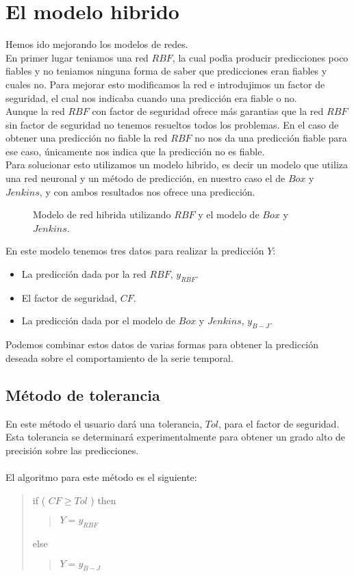 %
%

\section{El modelo hibrido}

Hemos ido mejorando los modelos de redes.\\

En primer lugar teniamos una red $RBF$, la cual pod\'{\i}a producir predicciones
poco fiables y no teniamos ninguna forma de saber que predicciones eran fiables
y cuales no. Para mejorar esto modificamos la red e introdujimos un factor de
seguridad, el cual nos indicaba cuando una predicci\'on era fiable o no.\\

Aunque la red $RBF$ con factor de seguridad ofrece m\'as garantias que la red
$RBF$ sin factor de seguridad no tenemos resueltos todos los problemas. En el 
caso de obtener una predicci\'on no fiable la red $RBF$ no nos da una
predicci\'on fiable para ese caso, \'unicamente nos indica que la predicci\'on
no es fiable.\\

Para solucionar esto utilizamos un modelo hibrido, es decir un modelo que
utiliza una red neuronal y un m\'etodo de predicci\'on, en nuestro caso el de
$Box$ y $Jenkins$, y con ambos resultados nos ofrece una predicci\'on.
%
\begin{figure}[!h]

\caption{Modelo de red hibrida utilizando $RBF$ y el modelo de $Box$ y
$Jenkins$.}
\end{figure}
%
\newpage
%
En este modelo tenemos tres datos para realizar la predicci\'on $Y$:
\begin{itemize}
\item La predicci\'on dada por la red $RBF$, $y_{RBF}$.
\item El factor de seguridad, $CF$.
\item La predicci\'on dada por el modelo de $Box$ y $Jenkins$, $y_{B-J}$.
\end{itemize}
Podemos combinar estos datos de varias formas para obtener la predicci\'on
deseada sobre el comportamiento de la serie temporal.

\subsection{M\'etodo de tolerancia}

En este m\'etodo el usuario dar\'a una tolerancia, $Tol$, para el factor de
seguridad. Esta tolerancia se determinar\'a experimentalmente para obtener un
grado alto de precisi\'on sobre las predicciones.\\ \\
%
El algoritmo para este m\'etodo es el siguiente:
\begin{quote}
if ( $CF\geq Tol$ ) then
\begin{quote}
$Y=y_{RBF}$
\end{quote}
else
\begin{quote}
$Y=y_{B-J}$
\end{quote}
\end{quote}


